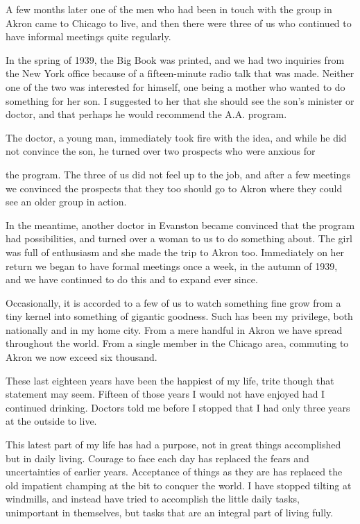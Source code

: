 A few months later one of the men who had been in touch with the group in Akron came to Chicago to live, and then there were three of us who continued to have informal meetings quite regularly.

In the spring of 1939, the Big Book was printed, and we had two inquiries from the New York office because of a fifteen-minute radio talk that was made. Neither one of the two was interested for himself, one being a mother who wanted to do something for her son. I suggested to her that she should see the son’s minister or doctor, and that perhaps he would recommend the A.A. program.

The doctor, a young man, immediately took fire with the idea, and while he did not convince the son, he turned over two prospects who were anxious for

the program. The three of us did not feel up to the job, and after a few meetings we convinced the prospects that they too should go to Akron where they could see an older group in action.

In the meantime, another doctor in Evanston became convinced that the program had possibilities, and turned over a woman to us to do something about. The girl was full of enthusiasm and she made the trip to Akron too. Immediately on her return we began to have formal meetings once a week, in the autumn of 1939, and we have continued to do this and to expand ever since.

Occasionally, it is accorded to a few of us to watch something fine grow from a tiny kernel into something of gigantic goodness. Such has been my privilege, both nationally and in my home city. From a mere handful in Akron we have spread throughout the world. From a single member in the Chicago area, commuting to Akron we now exceed six thousand.

These last eighteen years have been the happiest of my life, trite though that statement may seem. Fifteen of those years I would not have enjoyed had I continued drinking. Doctors told me before I stopped that I had only three years at the outside to live.

This latest part of my life has had a purpose, not in great things accomplished but in daily living. Courage to face each day has replaced the fears and uncertainties of earlier years. Acceptance of things as they are has replaced the old impatient champing at the bit to conquer the world. I have stopped tilting at windmills, and instead have tried to accomplish the little daily tasks, unimportant in themselves, but tasks that are an integral part of living fully.

